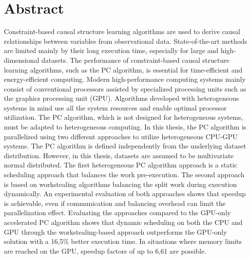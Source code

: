 \chapter*{Abstract}
Constraint-based causal structure learning algorithms are used to derive causal relationships between variables from observational data. State-of-the-art methods are limited mainly by their long execution time, especially for large and high-dimensional datasets. The performance of constraint-based causal structure learning algorithms, such as the PC algorithm, is essential for time-efficient and energy-efficient computing. Modern high-performance computing systems mainly consist of conventional processors assisted by specialized processing units such as the graphics processing unit (GPU). Algorithms developed with heterogeneous systems in mind use all the system resources and enable optimal processor utilization. The PC algorithm, which is not designed for heterogeneous systems, must be adapted to heterogeneous computing. In this thesis, the PC algorithm is parallelized using two different approaches to utilize heterogeneous CPU-GPU systems. The PC algorithm is defined independently from the underlying dataset distribution. However, in this thesis, datasets are assumed to be multivariate normal distributed. The first heterogeneous PC algorithm approach is a static scheduling approach that balances the work pre-execution. The second approach is based on workstealing algorithms balancing the split work during execution dynamically. An experimental evaluation of both approaches shows that speedup is achievable, even if communication and balancing overhead can limit the parallelization effect. Evaluating the approaches compared to the GPU-only accelerated PC algorithm shows that dynamic scheduling on both the CPU and GPU through the workstealing-based approach outperforms the GPU-only solution with a 16,5\% better execution time. In situations where memory limits are reached on the GPU, speedup factors of up to 6,61 are possible.
